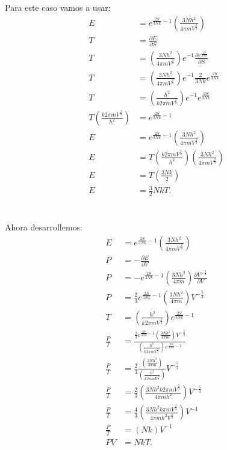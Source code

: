 \documentclass{report}
\begin{document}
Para este caso vamos a usar:
\begin{align*}
  E &= e^{\frac{2S}{3Nk} -1} \left(\frac{3Nh^2}{4 \pi m V^{\frac{2}{3}}}\right)\\
  T &= \frac{\partial E}{\partial S}\\
  T &= \left(\frac{3Nh^2}{4 \pi m V^{\frac{2}{3}}}\right) e^{-1} \frac{\partial e^{\frac{2S}{3Nk}}}{\partial S}\\
  T &= \left(\frac{3Nh^2}{4 \pi m V^{\frac{2}{3}}}\right) e^{-1} \frac{2}{3Nk}e^{\frac{2S}{3Nk}} \\
  T &= \left(\frac{h^2}{k 2 \pi m V^{\frac{2}{3}}}\right) e^{-1} e^{\frac{2S}{3Nk}} \\
  T \left(\frac{k 2 \pi m V^{\frac{2}{3}}}{h^2}\right) &= e^{\frac{2S}{3Nk} - 1} \\
  E &= e^{\frac{2S}{3Nk} -1} \left(\frac{3Nh^2}{4 \pi m V^{\frac{2}{3}}}\right)\\
  E &= T \left(\frac{k 2 \pi m V^{\frac{2}{3}}}{h^2}\right) \left(\frac{3Nh^2}{4 \pi m V^{\frac{2}{3}}}\right)\\
  E &= T \left(\frac{3Nk}{2}\right)\\
  E &= \frac{3}{2} NkT
.\end{align*}

\section{}

Ahora desarrollemos:
\begin{align*}
  E &= e^{\frac{2S}{3Nk} -1} \left(\frac{3Nh^2}{4 \pi m V^{\frac{2}{3}}}\right)\\
  P &= -\frac{\partial E}{\partial V} \\
  P &= -e^{\frac{2S}{3Nk} -1} \left(\frac{3Nh^2}{4 \pi m }\right)\frac{\partial V^{-\frac{2}{3}}}{\partial V} \\
  P &= \frac{2}{3}e^{\frac{2S}{3Nk} -1} \left(\frac{3Nh^2}{4 \pi m }\right)V^{- \frac{5}{3}} \\
  T &= \left(\frac{h^2}{k 2 \pi m V^{\frac{2}{3}}}\right) e^{\frac{2S}{3Nk} - 1} \\
  \frac{P}{T} &= \frac{\frac{2}{3}e^{\frac{2S}{3Nk} -1} \left(\frac{3Nh^2}{4 \pi m }\right)V^{- \frac{5}{3}}}{\left(\frac{h^2}{k 2 \pi m V^{\frac{2}{3}}}\right) e^{\frac{2S}{3Nk} - 1}}\\
  \frac{P}{T} &= \frac{2}{3}\frac{\left(\frac{3Nh^2}{4 \pi m }\right)}{\left(\frac{h^2}{k 2 \pi m V^{\frac{2}{3}}}\right)}V^{- \frac{5}{3}}\\
  \frac{P}{T} &= \frac{2}{3}\left(\frac{3Nh^2k 2 \pi m V^{\frac{2}{3}}}{4 \pi m h^2}\right)V^{- \frac{5}{3}}\\
  \frac{P}{T} &= \frac{4}{3}\left(\frac{3Nh^2k\pi m V^{\frac{2}{3}}}{4 \pi m h^2 V^{\frac{2}{3}}}\right)V^{-1}\\
  \frac{P}{T} &= \left(Nk\right)V^{-1} \\
  PV &= NkT
.\end{align*}
\end{document}
